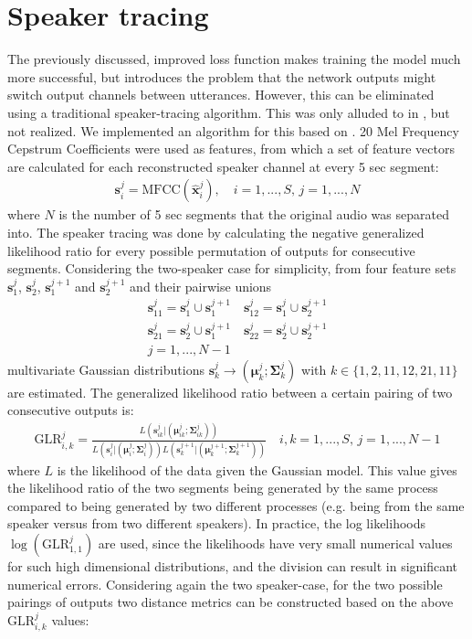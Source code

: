 \documentclass{article}
\newcommand{\mx}[1]{\mathbf{\bm{#1}}}
\begin{document}
\section{Speaker tracing}
The previously discussed, improved loss function makes training the model much more successful, but introduces the problem that the network outputs might switch output channels between utterances. However, this can be eliminated using a traditional speaker-tracing algorithm. This was only alluded to in \cite{YuKTJ16}, but not realized. We implemented an algorithm for this based on \cite{Lilt04}. 20 Mel Frequency Cepstrum Coefficients were used as features, from which a set of feature vectors are calculated for each reconstructed speaker channel at every 5 sec segment:
\begin{gather}
    \mx{s}^j_i = \mathrm{MFCC}(\hat{\mx{x}}^j_i), \quad i=1,...,S,\,j=1,...,N
\end{gather}
where $N$ is the number of 5 sec segments that the original audio was separated into. The speaker tracing was done by calculating the negative generalized likelihood ratio for every possible permutation of outputs for consecutive segments. Considering the two-speaker case for simplicity, from four feature sets $\mx{s}_1^j$, $\mx{s}_2^j$, $\mx{s}_1^{j+1}$ and $\mx{s}_2^{j+1}$ and their pairwise unions
\begin{gather}
    \mx{s}_{11}^j = \mx{s}_1^j \cup \mx{s}_1^{j+1} \quad \mx{s}_{12}^j = \mx{s}_1^j \cup \mx{s}_2^{j+1} \\
    \mx{s}_{21}^j = \mx{s}_2^j \cup \mx{s}_1^{j+1} \quad \mx{s}_{22}^j = \mx{s}_2^j \cup \mx{s}_2^{j+1} \\
    j=1,...,N-1 \nonumber
\end{gather}
multivariate Gaussian distributions $\mx{s}_{k}^j \rightarrow (\mx{\mu}_k^j;\mx{\Sigma}_k^j)$ with $k\in \{1,2,11,12,21,11\}$ are estimated. The generalized likelihood ratio between a certain pairing of two consecutive outputs is:
\begin{gather}
    \mathrm{GLR}^j_{i,k} = \frac{L(\mx{s}^j_{ik} | (\mx{\mu}_{ik}^j;\mx{\Sigma}_{ik}^j))}{L(\mx{s}^j_{i} | (\mx{\mu}_{i}^j;\mx{\Sigma}_{i}^j)) L(\mx{s}^{j+1}_{k} | (\mx{\mu}_{k}^{j+1};\mx{\Sigma}_{k}^{j+1}))} \quad i,k = 1,...,S,\,j=1,...,N-1
\end{gather}
where $L$ is the likelihood of the data given the Gaussian model. This value gives the likelihood ratio of the two segments being generated by the same process compared to being generated by two different processes (e.g. being from the same speaker versus from two different speakers). In practice, the log likelihoods $\log(\mathrm{GLR}^j_{1,1})$ are used, since the likelihoods have very small numerical values for such high dimensional distributions, and the division can result in significant numerical errors. Considering again the two speaker-case, for the two possible pairings of outputs two distance metrics can be constructed based on the above $\mathrm{GLR}^j_{i,k}$ values:
\end{document}
